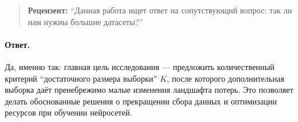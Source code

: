 \documentclass[11pt]{article}
\begin{document}
\begin{quote}
    \textbf{Рецензент:}
    ``Данная работа ищет ответ на сопутствующий вопрос: так ли нам нужны большие датасеты?''
\end{quote}

\paragraph{Ответ.}
Да, именно так: главная цель исследования — предложить количественный критерий ``достаточного размера выборки'' $K$,
после которого дополнительная выборка даёт пренебрежимо малые изменения ландшафта потерь. Это позволяет делать обоснованные
решения о прекращении сбора данных и оптимизации ресурсов при обучении нейросетей.
\end{document}
